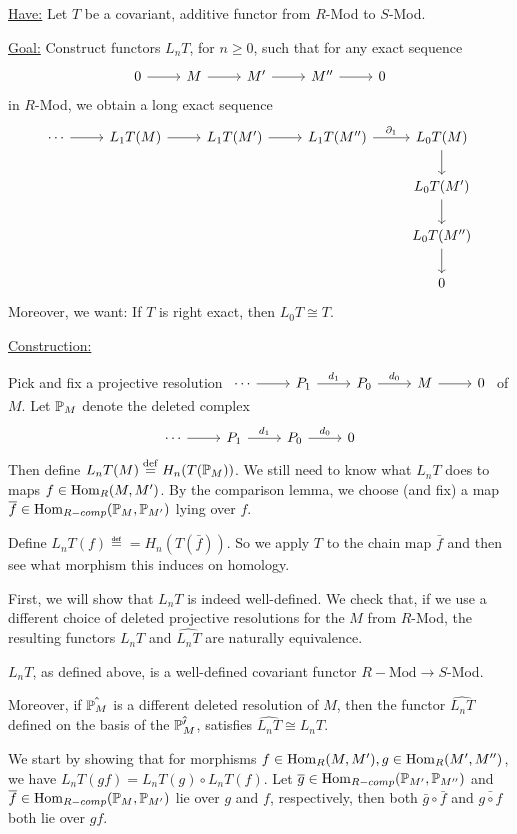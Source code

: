 \documentclass[x11names,reqno,14pt]{extarticle}
\newcommand{\RMod}{R-\text{Mod}}
\newcommand{\barf}{\bar{f}}
\renewcommand{\P}{\mathbb{P}}
\begin{document}
\underline{Have:} Let $T$ be a covariant, additive functor from $R$-Mod to $S$-Mod. 

\underline{Goal:} Construct functors $L_nT$, for $n \geq 0$, such that for any exact sequence 
\[
\exactshort{M}{}{M'}{}{M''}
\]
in $R$-Mod, we obtain a long exact sequence
\[
\begin{tikzcd}
\cdots\ar[r]& L_1T(M)\ar[r]& L_1T(M')\ar[r] & L_1T(M'')\ar[r, "\del_1"] & L_0T(M) \ar[d] \\&&&& L_0T(M') \ar[d]\\&&&& L_0T(M'') \ar[d]\\&&&&0
\end{tikzcd}
\]
Moreover, we want: If $T$ is right exact, then $L_0T \cong T$. 

\underline{Construction:}

Pick and fix a projective resolution $\begin{tikzcd} \cdots \ar[r]& P_1\ar[r, "d_1"] & P_0\ar[r, "d_0"] & M \ar[r]& 0 \end{tikzcd}$ of $M$. Let $\mathbb{P}_M$ denote the deleted complex 
\[
\begin{tikzcd} \cdots \ar[r]& P_1\ar[r, "d_1"] & P_0\ar[r, "d_0"] & 0 \end{tikzcd}
\]
Then define $L_nT(M) \overset{\mathrm{def}}{=} H_n(T(\mathbb{P}_M))$. We still need to know what $L_nT$ does to maps $f\in{\mathrm{Hom}}_R(M, M')$. By the comparison lemma, we choose (and fix) a map $\barf\in\Hom_{R-comp}(\mbb{P}_M, \mbb{P}_{M'})$ lying over $f$. 

Define $L_nT(f) \eqdef = H_n(T(\barf))$. So we apply $T$ to the chain map $\barf$ and then see what morphism this induces on homology. 

First, we will show that $L_nT$ is indeed well-defined. We check that, if we use a different choice of deleted projective resolutions for the $M$ from $R$-Mod, the resulting functors $L_nT$ and $\hat{L_nT}$ are naturally equivalence. 

\thm

$L_nT$, as defined above, is a well-defined covariant functor $\RMod\to S$-Mod.

Moreover, if $\hat{\mathbb{P}_M}$ is a different deleted resolution of $M$, then the functor $\hat{L_nT}$ defined on the basis of the $\hat{\mathbb{P}_M'}$, satisfies $\hat{L_nT} \cong L_nT$.

\proof

We start by showing that for morphisms $f\in{\mathrm{Hom}}_R(M, M'), g \in {\mathrm{Hom}}_R(M',M'')$, we have $L_nT(gf) = L_nT(g)\circ L_nT(f)$. Let $\bar{g}\in\Hom_{R-comp}(\P_{M'}, \P_{M''})$ and $\barf\in\Hom_{R-comp}(\P_M, \P_{M'})$ lie over $g$ and $f$, respectively, then both $\bar{g}\circ\barf$ and $\bar{g\circ f}$ both lie over $gf$. 
\end{document}
